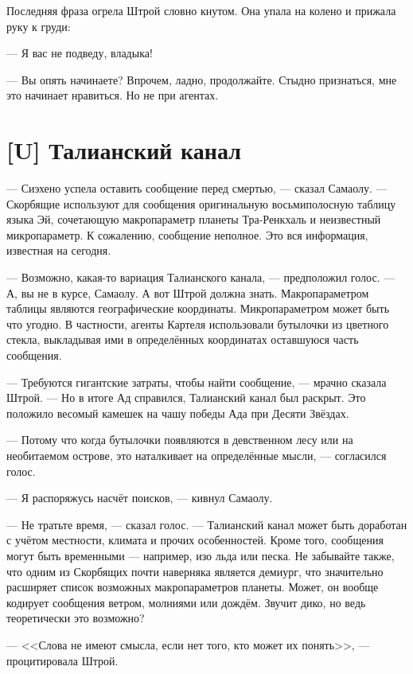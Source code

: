 Последняя фраза огрела Штрой словно кнутом.
Она упала на колено и прижала руку к груди:

--- Я вас не подведу, владыка!

--- Вы опять начинаете?
Впрочем, ладно, продолжайте.
Стыдно признаться, мне это начинает нравиться.
Но не при агентах.

\textspace

\section{[U] Талианский канал}

\textspace

--- Сиэхено успела оставить сообщение перед смертью, --- сказал Самаолу.
--- Скорбящие используют для сообщения оригинальную восьмиполосную таблицу языка Эй, сочетающую макропараметр планеты Тра-Ренкхаль и неизвестный микропараметр.
К сожалению, сообщение неполное.
Это вся информация, известная на сегодня.

--- Возможно, какая-то вариация Талианского канала, --- предположил голос.
--- А, вы не в курсе, Самаолу.
А вот Штрой должна знать.
Макропараметром таблицы являются географические координаты.
Микропараметром может быть что угодно.
В частности, агенты Картеля использовали бутылочки из цветного стекла, выкладывая ими в определённых координатах оставшуюся часть сообщения.

--- Требуются гигантские затраты, чтобы найти сообщение, --- мрачно сказала Штрой.
--- Но в итоге Ад справился, Талианский канал был раскрыт.
Это положило весомый камешек на чашу победы Ада при Десяти Звёздах.

--- Потому что когда бутылочки появляются в девственном лесу или на необитаемом острове, это наталкивает на определённые мысли, --- согласился голос.

--- Я распоряжусь насчёт поисков, --- кивнул Самаолу.

--- Не тратьте время, --- сказал голос.
--- Талианский канал может быть доработан с учётом местности, климата и прочих особенностей.
Кроме того, сообщения могут быть временными --- например, изо льда или песка.
Не забывайте также, что одним из Скорбящих почти наверняка является демиург, что значительно расширяет список возможных макропараметров планеты.
Может, он вообще кодирует сообщения ветром, молниями или дождём.
Звучит дико, но ведь теоретически это возможно?

--- <<Слова не имеют смысла, если нет того, кто может их понять>>, --- процитировала Штрой.

